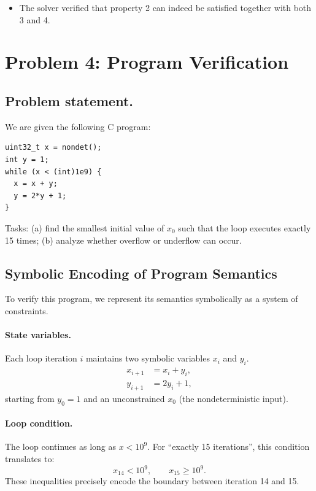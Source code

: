 \documentclass{article}
\begin{document}
\begin{itemize}
    \item The solver verified that property 2 can indeed be satisfied together with both 3 and 4.
\end{itemize}


\section*{Problem 4: Program Verification }
\setcounter{section}{0}

\subsection*{Problem statement.}
We are given the following C program:
\begin{verbatim}
uint32_t x = nondet();
int y = 1;
while (x < (int)1e9) {
  x = x + y;
  y = 2*y + 1;
}
\end{verbatim}
Tasks:
(a) find the smallest initial value of \(x_0\) such that the loop executes exactly 15 times;
(b) analyze whether overflow or underflow can occur.

\subsection*{Symbolic Encoding of Program Semantics}

To verify this program, we represent its semantics symbolically as a system of constraints.

\paragraph{State variables.}
Each loop iteration \(i\) maintains two symbolic variables \(x_i\) and \(y_i\).
\begin{align*}
x_{i+1} &= x_i + y_i,\\
y_{i+1} &= 2y_i + 1,
\end{align*}
starting from \(y_0 = 1\) and an unconstrained \(x_0\) (the nondeterministic input).

\paragraph{Loop condition.}
The loop continues as long as \(x < 10^9\).
For “exactly 15 iterations”, this condition translates to:
\[
x_{14} < 10^9, \qquad x_{15} \ge 10^9.
\]
These inequalities precisely encode the boundary between iteration 14 and 15.
\end{document}
